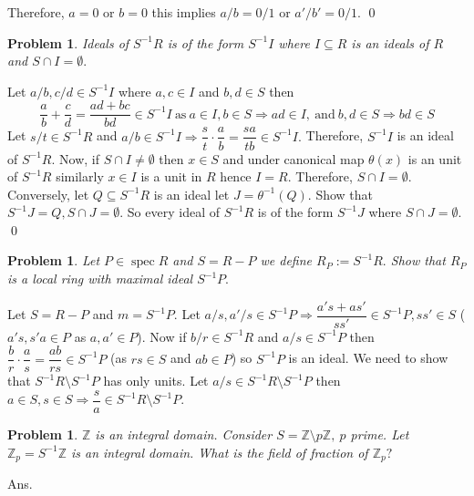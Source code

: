 \documentclass[11pt]{amsart}
\newtheorem{problem}[theorem]{Problem}
\newcommand{\ZZ}{\mathbb Z}
\begin{document}
Therefore, $a=0$ or $b=0$ this implies $a/b=0/1$ or $a'/b'=0/1.$ \qed\\
\begin{problem}
Ideals of $S^{-1}R$ is of the form $S^{-1}I$ where $I\subseteq R$ is an ideals of $R$ and $S\cap I=\emptyset.$
\end{problem}
\proof Let $a/b,c/d\in S^{-1}I$ where $a,c\in I$ and $b,d\in S$ then $$\dfrac{a}{b}+\dfrac{c}{d}=\dfrac{ad+bc}{bd}\in S^{-1}I~\text{as}~a\in I,b\in S\Rightarrow ad\in I,~\text{and}~b,d\in S\Rightarrow bd\in S$$
Let $s/t\in S^{-1}R$ and $a/b\in S^{-1}I \Rightarrow \dfrac{s}{t}\cdot \dfrac{a}{b}=\dfrac{sa}{tb}\in S^{-1}I.$ Therefore, $S^{-1}I$ is an ideal of $S^{-1}R.$ Now, if $S\cap I\neq \emptyset$ then $x\in S$ and under canonical map $\theta(x)$ is an unit of $S^{-1}R$ similarly $x\in I$ is a unit in $R$ hence $I=R.$ Therefore, $S\cap I=\emptyset.$\\
Conversely, let $Q\subseteq S^{-1}R$ is an ideal let $J=\theta^{-1}(Q).$ Show that $S^{-1}J=Q,S\cap J=\emptyset.$ So every ideal of $S^{-1}R$ is of the form $S^{-1}J$ where $S\cap J=\emptyset.$ \qed
\begin{problem}
Let $P\in \operatorname{spec}R$ and $S=R-P$ we define $R_P:=S^{-1}R.$ Show that $R_P$ is a local ring with maximal ideal $S^{-1}P.$
\end{problem}
\proof Let $S=R-P$ and $m=S^{-1}P.$ Let $a/s,a'/s\in S^{-1}P \Rightarrow \dfrac{a's+as'}{ss'}\in S^{-1}P,ss'\in S$ ($a's,s'a\in P$ as $a,a'\in P$). Now if $b/r\in S^{-1}R$ and $a/s\in S^{-1}P$ then $\dfrac{b}{r}\cdot \dfrac{a}{s}=\dfrac{ab}{rs}\in S^{-1}P$ (as $rs\in S$ and $ab\in P$) so $S^{-1}P$ is an ideal. We need to show that $S^{-1}R\setminus S^{-1}P$ has only units. Let $a/s\in S^{-1}R\setminus S^{-1}P$ then $a\in S,s\in S \Rightarrow \dfrac{s}{a}\in S^{-1}R\setminus S^{-1}P.$


\begin{problem}
${\ZZ}$ is an integral domain. Consider $S={\ZZ}\setminus p{\ZZ},~p$ prime. Let ${\ZZ}_p=S^{-1}{\ZZ}$ is an integral domain. What is the field of fraction of ${\ZZ}_p?$
\end{problem}
Ans.


\newpage
\end{document}

